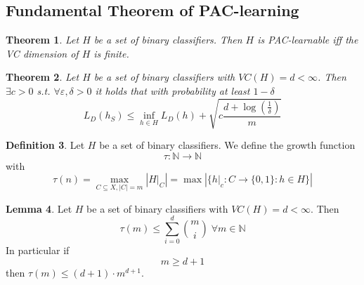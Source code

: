 \documentclass[a4paper, 12pt]{article}
\theoremstyle{plain}
\newtheorem{theorem}{Theorem}[subsection] %
\theoremstyle{definition}
\newtheorem{definition}[theorem]{Definition} %
\theoremstyle{lemma}
\newtheorem{lemma}[theorem]{Lemma}
\theoremstyle{remark}
\theoremstyle{example}
\begin{document}
	\subsection{Fundamental Theorem of PAC-learning}
	\begin{theorem}
		Let $H$ be a set of binary classifiers. Then $H$ is PAC-learnable iff the VC dimension of $H$ is finite.
	\end{theorem}
	\begin{theorem}
		Let $H$ be a set of binary classifiers with $VC(H) = d < \infty$. Then $\exists c > 0$ s.t. $\forall \varepsilon, \delta > 0$ it holds that with probability at least $1-\delta$ \[L_D(h_S) \leq \inf_{h \in H} L_D(h) + \sqrt{c\frac{d+\log(\frac{1}{\delta})}{m}}\]
	\end{theorem}
	\begin{definition}
		Let $H$ be a set of binary classifiers. We define the growth function \[\tau: \mathbb{N} \to \mathbb{N}\] with \[\tau(n) = \max\limits_{C\subseteq X, \left|C\right| = m} \left|H|_C\right| = \max\left|\{h|_c: C \to \{0,1\}: h \in H\}\right|\]
	\end{definition}
	\begin{lemma}
		Let $H$ be a set of binary classifiers with $VC(H) = d < \infty$. Then \[\tau(m) \leq \sum_{i=0}^d \binom{m}{i} \; \forall m \in \mathbb{N}\] In particular if \[m \geq d+1\] then $\tau(m) \leq (d+1)\cdot m^{d+1}$.
	\end{lemma}
\end{document}
